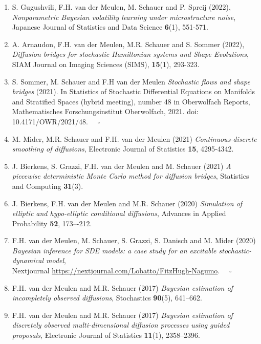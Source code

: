 \documentclass[
10pt, %
a4paper, %
oneside, %
headinclude,footinclude, %
BCOR5mm, %
]{scrartcl}
\begin{document}
\begin{enumerate}
\item {\sc S. Gugushvili, F.H. van der Meulen, M. Schauer and P. Spreij} (2022), {\it  Nonparametric Bayesian volatility learning under microstructure noise}, Japanese Journal of Statistics and Data Science {\bf 6}(1), 551-571.

\item {\sc A. Arnaudon, F.H. van der Meulen, M.R. Schauer and S. Sommer} (2022), {\it Diffusion bridges for stochastic Hamiltonian systems and Shape Evolutions},  SIAM Journal on Imaging Sciences (SIMS), {\bf 15}(1), 293-323.

\item {\sc S. Sommer, M. Schauer and F.H van der Meulen}  {\it Stochastic flows and shape bridges} (2021). In Statistics of Stochastic Differential Equations on Manifolds and Stratified Spaces (hybrid meeting), number 48 in Oberwolfach Reports, Mathematisches For\-schungs\-institut Oberwolfach, 2021. doi: 10.4171/OWR/2021/48. \hspace*{\fill} $\quad \square$


\item {\sc M. Mider, M.R. Schauer and F.H. van der Meulen (2021)} {\it  Continuous-discrete smoothing of diffusions}, Electronic Journal of Statistics {\bf 15}, 4295-4342.   


\item {\sc J. Bierkens, S. Grazzi, F.H. van der Meulen and M. Schauer (2021)} {\it A piecewise deterministic Monte Carlo method for diffusion bridges}, Statistics and Computing {\bf 31}(3).

\item {\sc J. Bierkens, F.H. van der Meulen and M.R. Schauer (2020)} {\it  Simulation of elliptic and hypo-elliptic conditional diffusions}, Advances in Applied Probability {\bf 52}, 173–-212.

\item {\sc F.H. van der Meulen, M. Schauer, S. Grazzi, S. Danisch and M. Mider (2020)} {\it  Bayesian inference for SDE models: a case study for an excitable stochastic-dynamical model},  \\ Nextjournal \url{https://nextjournal.com/Lobatto/FitzHugh-Nagumo}.\hspace*{\fill} $\quad \square$

\item {\sc F.H. van der Meulen and M.R. Schauer (2017)} {\it  Bayesian estimation of incompletely observed diffusions}, Stochastics {\bf 90}(5), 641--662.

\item {\sc F.H. van der Meulen and M.R. Schauer (2017)} {\it  Bayesian estimation of discretely observed multi-dimensional diffusion processes using guided proposals},  Electronic Journal of Statistics {\bf 11}(1), 2358--2396.


\end{enumerate}
\end{document}
